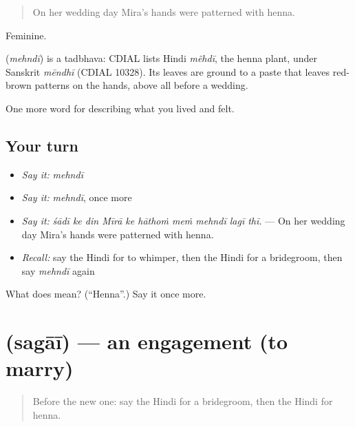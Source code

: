 \begin{quote}
On her wedding day Mira's hands were patterned with henna.
\end{quote}

Feminine.

\begin{cousinweb}
\textbf{} (\emph{mehndī}) is a tadbhava: CDIAL lists Hindi \emph{mẽhdī}, the henna plant, under Sanskrit \emph{mēndhī} (CDIAL 10328). Its leaves are ground to a paste that leaves red-brown patterns on the hands, above all before a wedding.
\end{cousinweb}

\begin{grammarlens}[title={What you've built}]
One more word for describing what you lived and felt.
\end{grammarlens}

\subsection*{Your turn}
\begin{itemize}
\raggedright
  \item \emph{Say it:} \emph{mehndī}
  \item \emph{Say it:} \emph{mehndī}, once more
  \item \emph{Say it:} \emph{śādī ke din Mīrā ke hāthoṁ meṁ mehndī lagī thī.} — On her wedding day Mira's hands were patterned with henna.
  \item \emph{Recall:} say the Hindi for to whimper, then the Hindi for a bridegroom, then say \emph{mehndī} again
\end{itemize}

\begin{tcolorbox}[breakable,colback=teal!4,colframe=teal!35!black,title={Before you move on}]
What does  mean? (\textquotedblleft{}Henna\textquotedblright{}.) Say it once more.
\end{tcolorbox}
\section[\texorpdfstring{\hi{सगाई} (sagāī)}{सगाई (sagāī)}]{ (sagāī) — an engagement (to marry)}

\label{lesson:HI-C500-sagai}



\begin{quote}
Before the new one: say the Hindi for a bridegroom, then the Hindi for henna.
\end{quote}

